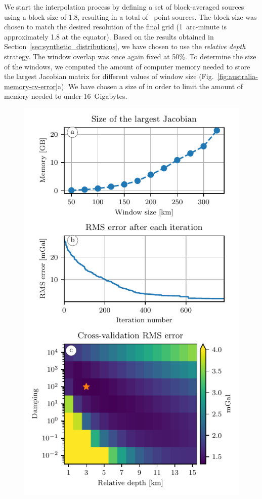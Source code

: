 We start the interpolation process by defining a set of block-averaged sources
using a block size of 1.8\km{}, resulting in a total of
\AustraliaEqlNSources{}~point sources.
The block size was chosen to match the desired resolution of the final grid
(1~arc-minute is approximately 1.8\km{} at the equator).
Based on the results obtained in Section~\ref{sec:synthetic_distributions}, we
have chosen to use the \emph{relative depth} strategy.
The window overlap was once again fixed at 50\%.
To determine the size of the windows, we computed the amount of computer memory
needed to store the largest Jacobian matrix for different values of window size
(Fig.~\ref{fig:australia-memory-cv-error}a).
We have chosen a size of \AustraliaEqlWindowSize{} in order to limit the
amount of memory needed to under 16~Gigabytes.

\begin{figure}
    \includegraphics[width=\linewidth]{figs/australia-memory-cv-error.pdf}

\end{figure}

